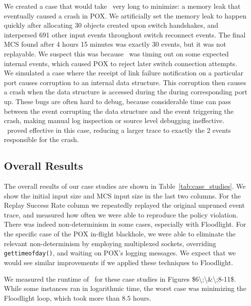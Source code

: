 We created a case that would take \projectname~very long to minimize: a
memory leak that eventually caused a crash in POX. We artificially set the
memory leak to happen quickly after allocating 30 objects created upon switch
handshakes, and interpersed 691 other input events throughout switch reconnect
events. The final MCS found after 4 hours 15 minutes was exactly 30 events, but it
was not replayable. We suspect this was because \projectname~was timing out on
some expected internal events, which caused POX to reject later switch
connection attempts.\\[0.5ex]
%
We simulated a case where the receipt of
link failure notification on a particular port causes corruption to an internal data
structure. This corruption then causes a crash when the data structure is
accessed during the during corresponding port up. These bugs
are often hard to debug, because considerable time can pass between the event
corrupting the data structure and the event triggering the crash, making
manual log inspection or source level debugging ineffective.
\projectname~proved effective in this case, reducing a larger trace to
exactly the 2 events responsible for the crash.

\subsection{Overall Results}

The overall results of our case studies are
shown in Table~\ref{tab:case_studies}.
\num{We show the initial input size and MCS input size in the last two
columns.}
For the Replay Success Rate column we
repeatedly replayed the original unpruned event trace, and measured how often we
were able to reproduce the policy violation. There was indeed non-determinism
in some cases, especially with Floodlight. For the specific case of
the POX in-flight blackhole, we were able to eliminate the relevant
non-determinism by employing multiplexed sockets, overriding {\tt
gettimeofday()}, and waiting on
POX's logging messages. \num{We expect that we would see similar improvements if we
applied these techniques to Floodlight.}

We measured the runtime of \projectname~for these case studies in Figures
\num{$6\;\&\;8-11$}.
While some instances ran in logarithmic time, the worst case was minimizing
the Floodlight loop,
which took more than $8.5$ hours.


